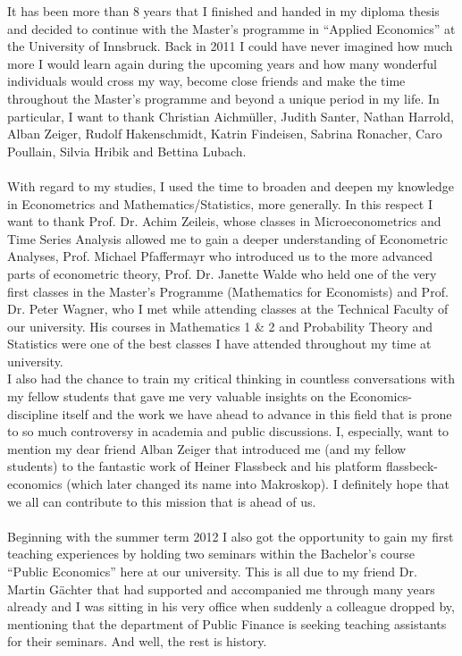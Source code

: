 It has been more than 8 years that I finished and handed in my diploma thesis and decided to continue with the Master's programme in ``Applied Economics'' at the University of Innsbruck. Back in 2011 I could have never imagined how much more I would learn again during the upcoming years and how many wonderful individuals would cross my way, become close friends and make the time throughout the Master's programme and beyond a unique period in my life. In particular, I want to thank Christian Aichmüller, Judith Santer, Nathan Harrold, Alban Zeiger, Rudolf Hakenschmidt, Katrin Findeisen, Sabrina Ronacher, Caro Poullain, Silvia Hribik and Bettina Lubach. \\ 
\\
With regard to my studies, I used the time to broaden and deepen my knowledge in Econometrics and Mathematics/Statistics, more generally. In this respect I want to thank Prof. Dr. Achim Zeileis, whose classes in Microeconometrics and Time Series Analysis allowed me to gain a deeper understanding of Econometric Analyses, Prof. Michael Pfaffermayr who introduced us to the more advanced parts of econometric theory, Prof. Dr. Janette Walde who held one of the very first classes in the Master's Programme (Mathematics for Economists) and Prof. Dr. Peter Wagner, who I met while attending classes at the Technical Faculty of our university. His courses in Mathematics 1 \& 2 and Probability Theory and Statistics were one of the best classes I have attended throughout my time at university.\\
I also had the chance to train my critical thinking in countless conversations with my fellow students that gave me very valuable insights on the Economics-discipline itself and the work we have ahead to advance in this field that is prone to so much controversy in academia and public discussions. I, especially, want to mention my dear friend Alban Zeiger that introduced me (and my fellow students) to the fantastic work of Heiner Flassbeck and his platform flassbeck-economics (which later changed its name into Makroskop). I definitely hope that we all can contribute to this mission that is ahead of us.\\
\\
Beginning with the summer term 2012 I also got the opportunity to gain my first teaching experiences by holding two seminars within the Bachelor's course ``Public Economics'' here at our university. This is all due to my friend Dr. Martin Gächter that had supported and accompanied me through many years already and I was sitting in his very office when suddenly a colleague dropped by, mentioning that the department of Public Finance is seeking teaching assistants for their seminars. And well, the rest is history.
